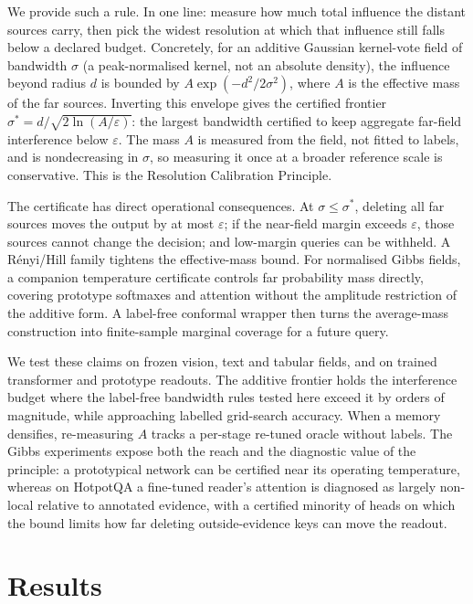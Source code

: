 \documentclass[10pt,twocolumn]{article}
\newcommand{\sstar}{\sigma^{*}}
\begin{document}
We provide such a rule. In one line: measure how much total influence the distant sources carry, then pick the widest resolution at which that influence still falls below a declared budget. Concretely, for an additive Gaussian kernel-vote field of bandwidth $\sigma$ (a peak-normalised kernel, not an absolute density), the influence beyond radius $d$ is bounded by $A\exp(-d^2/2\sigma^2)$, where $A$ is the effective mass of the far sources. Inverting this envelope gives the certified frontier $\sstar=d/\sqrt{2\ln(A/\varepsilon)}$: the largest bandwidth certified to keep aggregate far-field interference below $\varepsilon$. The mass $A$ is measured from the field, not fitted to labels, and is nondecreasing in $\sigma$, so measuring it once at a broader reference scale is conservative. This is the Resolution Calibration Principle.

The certificate has direct operational consequences. At $\sigma\le\sstar$, deleting all far sources moves the output by at most $\varepsilon$; if the near-field margin exceeds $\varepsilon$, those sources cannot change the decision; and low-margin queries can be withheld. A R\'enyi/Hill family tightens the effective-mass bound. For normalised Gibbs fields, a companion temperature certificate controls far probability mass directly, covering prototype softmaxes and attention without the amplitude restriction of the additive form. A label-free conformal wrapper then turns the average-mass construction into finite-sample marginal coverage for a future query.

We test these claims on frozen vision, text and tabular fields, and on trained transformer and prototype readouts. The additive frontier holds the interference budget where the label-free bandwidth rules tested here exceed it by orders of magnitude, while approaching labelled grid-search accuracy. When a memory densifies, re-measuring $A$ tracks a per-stage re-tuned oracle without labels. The Gibbs experiments expose both the reach and the diagnostic value of the principle: a prototypical network can be certified near its operating temperature, whereas on HotpotQA a fine-tuned reader's attention is diagnosed as largely non-local relative to annotated evidence, with a certified minority of heads on which the bound limits how far deleting outside-evidence keys can move the readout.

\section{Results}
\end{document}
